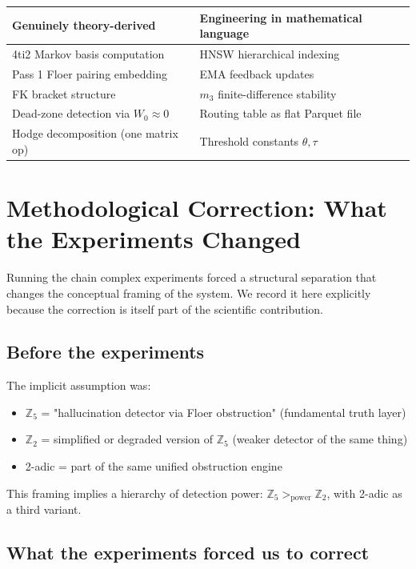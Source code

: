 \documentclass[11pt,a4paper]{article}
\begin{document}
\begin{center}
\renewcommand{\arraystretch}{1.3}
\begin{tabular}{ll}
\toprule
\textbf{Genuinely theory-derived} & \textbf{Engineering in mathematical language} \\
\midrule
4ti2 Markov basis computation & HNSW hierarchical indexing \\
Pass 1 Floer pairing embedding & EMA feedback updates \\
FK bracket structure & $m_3$ finite-difference stability \\
Dead-zone detection via $W_0 \approx 0$ & Routing table as flat Parquet file \\
Hodge decomposition (one matrix op) & Threshold constants $\theta, \tau$ \\
\bottomrule
\end{tabular}
\end{center}

\section{Methodological Correction: What the Experiments Changed}
\label{sec:correction}

Running the chain complex experiments forced a structural separation
that changes the conceptual framing of the system.
We record it here explicitly because the correction is itself part of
the scientific contribution.

\subsection*{Before the experiments}

The implicit assumption was:
\begin{itemize}
  \item $\mathbb{Z}_5$ = "hallucination detector via Floer obstruction"
        (fundamental truth layer)
  \item $\mathbb{Z}_2$ = simplified or degraded version of $\mathbb{Z}_5$
        (weaker detector of the same thing)
  \item 2-adic = part of the same unified obstruction engine
\end{itemize}
This framing implies a hierarchy of detection power:
$\mathbb{Z}_5 >_{\text{power}} \mathbb{Z}_2$,
with 2-adic as a third variant.

\subsection*{What the experiments forced us to correct}
\end{document}
